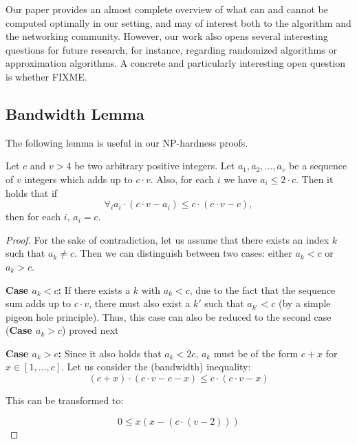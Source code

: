 \documentclass[9pt,twocolumn]{scrartcl}
\begin{document}
Our paper provides an almost complete overview of what can and cannot be
computed optimally in our setting, and may of interest both to the algorithm
and the networking community. However, our work also opens several interesting
questions for future research, for instance, regarding randomized algorithms
or approximation algorithms. A concrete and particularly interesting open
question is whether FIXME.



%



\begin{appendix}


\section{Bandwidth Lemma}

The following lemma is useful in our NP-hardness proofs.

\begin{lemma}\label{lem:bandwidth-lemma}
  Let $c$ and $v > 4$ be two arbitrary positive integers. Let $a_1, a_2, \ldots,
  a_v$ be a sequence of $v$ integers which adds up to $c \cdot v$. Also, for
  each $i$ we have $a_i \leq 2 \cdot c$. Then it holds that if
  $$ \forall_i a_i \cdot (c \cdot v - a_i) \leq c \cdot (c \cdot v -
  c), $$
\noindent  then for each $i$, $a_i = c$.
\end{lemma}
\begin{proof}
For the sake of contradiction, let us assume that there exists an index $k$ such that
$a_k \neq c$. Then we can distinguish between two cases:
either $a_k<c$ or
$a_k>c$.

\textbf{Case $a_k<c$:} If there exists a $k$ with $a_k<c$,
due to the fact that the sequence sum adds up to $c \cdot v$,
there must also exist a $k'$ such that $a_{k'}<c$ (by a simple
pigeon hole principle). Thus, this case can
also be reduced to the second case (\textbf{Case $a_k>c$}) proved
next

\textbf{Case $a_k>c$:} Since it also holds that $a_k < 2c$,
$a_k$ must be of the form $c + x$ for $x \in [1, \ldots, c]$.
Let us consider the (bandwidth) inequality:
$$ (c + x) \cdot (c \cdot v - c - x) \leq c \cdot (c \cdot v - x) $$

This can be transformed to:

$$ 0 \leq x(x - (c \cdot (v - 2))) $$


\end{proof}
\end{appendix}
\end{document}
